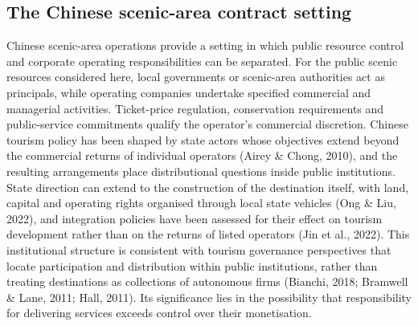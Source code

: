 \documentclass[review,3p,times]{elsarticle}
\begin{document}
\subsection{The Chinese scenic-area contract setting}

Chinese scenic-area operations provide a setting in which public resource control and corporate operating responsibilities can be separated. For the public scenic resources considered here, local governments or scenic-area authorities act as principals, while operating companies undertake specified commercial and managerial activities. Ticket-price regulation, conservation requirements and public-service commitments qualify the operator's commercial discretion. Chinese tourism policy has been shaped by state actors whose objectives extend beyond the commercial returns of individual operators (Airey \& Chong, 2010), and the resulting arrangements place distributional questions inside public institutions. State direction can extend to the construction of the destination itself, with land, capital and operating rights organised through local state vehicles (Ong \& Liu, 2022), and integration policies have been assessed for their effect on tourism development rather than on the returns of listed operators (Jin et al., 2022). This institutional structure is consistent with tourism governance perspectives that locate participation and distribution within public institutions, rather than treating destinations as collections of autonomous firms (Bianchi, 2018; Bramwell \& Lane, 2011; Hall, 2011). Its significance lies in the possibility that responsibility for delivering services exceeds control over their monetisation.
\end{document}
